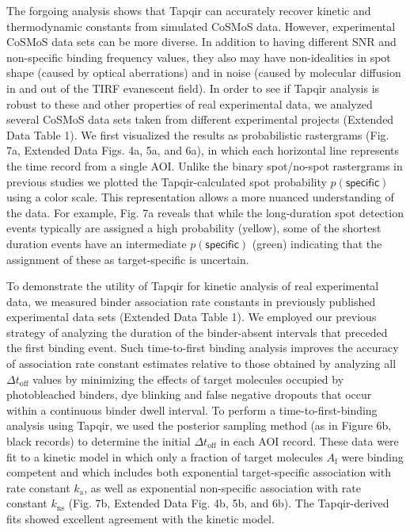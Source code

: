 The forgoing analysis shows that Tapqir can accurately recover kinetic and thermodynamic constants from simulated CoSMoS data.  However, experimental CoSMoS data sets can be more diverse.  In addition to having different SNR and non-specific binding frequency values, they also may have non-idealities in spot shape (caused by optical aberrations) and in noise (caused by molecular diffusion in and out of the TIRF evanescent field).  In order to see if Tapqir analysis is robust to these and other properties of real experimental data, we analyzed several CoSMoS data sets taken from different experimental projects (Extended Data Table 1). We first visualized the results as probabilistic rastergrams (Fig. 7a, Extended Data Figs. 4a, 5a, and 6a), in which each horizontal line represents the time record from a single AOI.  Unlike the binary spot/no-spot rastergrams in previous studies \cite{Friedman2013-sf,Rosen2020-zn} we plotted the Tapqir-calculated spot probability $p(\mathsf{specific})$ using a color scale.  This representation allows a more nuanced understanding of the data.  For example, Fig. 7a reveals that while the long-duration spot detection events typically are assigned a high probability (yellow), some of the shortest duration events have an intermediate $p(\mathsf{specific})$ (green) indicating that the assignment of these as target-specific is uncertain.  

To demonstrate the utility of Tapqir for kinetic analysis of real experimental data, we measured binder association rate constants in previously published experimental data sets (Extended Data Table 1).  We employed our previous strategy \cite{Friedman2006-kb} of analyzing the duration of the binder-absent intervals that preceded the first binding event.  Such time-to-first binding analysis improves the accuracy of association rate constant estimates relative to those obtained by analyzing all $\Delta t_\mathrm{off}$ values by minimizing the effects of target molecules occupied by photobleached binders, dye blinking and false negative dropouts that occur within a continuous binder dwell interval.  To perform a time-to-first-binding analysis using Tapqir, we used the posterior sampling method (as in Figure 6b, black records) to determine the initial $\Delta t_\mathrm{off}$ in each AOI record. These data were fit to a kinetic model \cite{Friedman2006-kb} in which only a fraction of target molecules $A_\mathrm{f}$ were binding competent and which includes both exponential target-specific association with rate constant $k_\mathrm{a}$, as well as exponential non-specific association with rate constant $k_\mathrm{ns}$ (Fig. 7b, Extended Data Fig. 4b, 5b, and 6b).  The Tapqir-derived fits showed excellent agreement with the kinetic model.  

